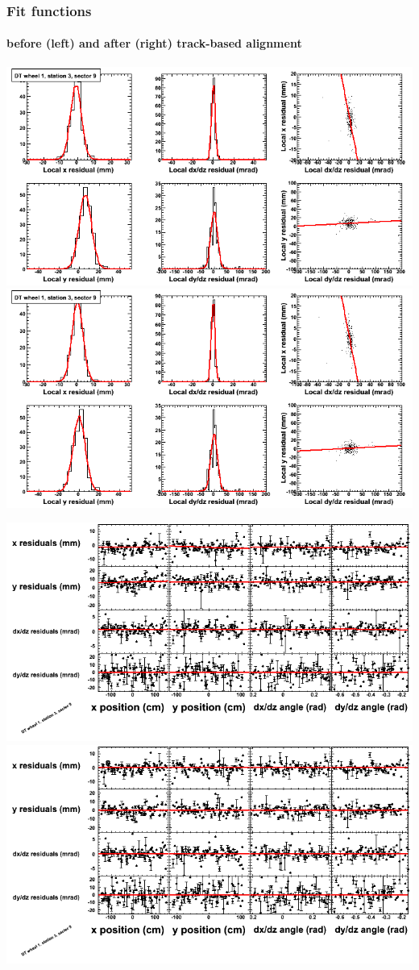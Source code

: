 \documentclass[compress]{beamer}
\begin{document}
\begin{frame}
\frametitle{Fit functions}
\framesubtitle{before (left) and after (right) track-based alignment}
\includegraphics[width=0.5\linewidth]{fitfunctions_re01/MBwhDst3sec09_bellcurves.png} \includegraphics[width=0.5\linewidth]{fitfunctions_re05/MBwhDst3sec09_bellcurves.png}

\includegraphics[width=0.5\linewidth]{fitfunctions_re01/MBwhDst3sec09_polynomials.png} \includegraphics[width=0.5\linewidth]{fitfunctions_re05/MBwhDst3sec09_polynomials.png}
\end{frame}
\end{document}
